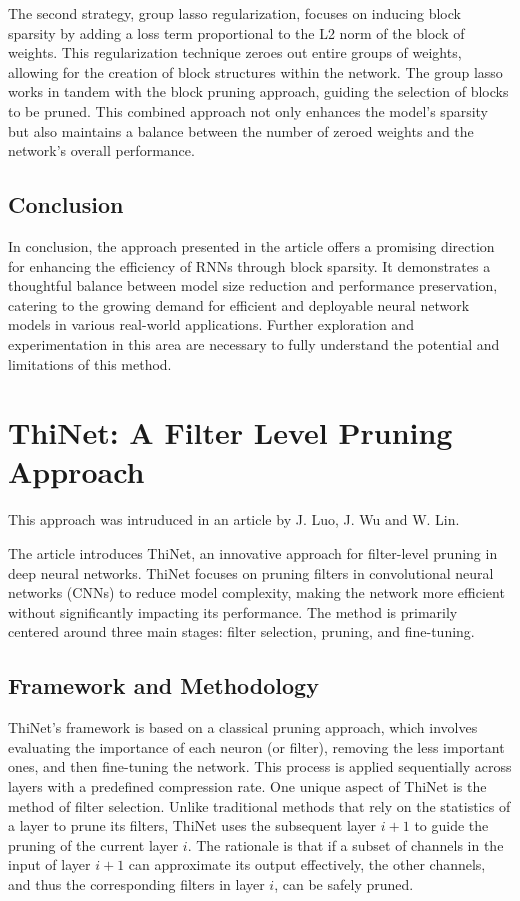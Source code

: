 The second strategy, group lasso regularization, focuses on inducing block sparsity by adding a loss term proportional to the L2 norm of the block of weights. This regularization technique zeroes out entire groups of weights, allowing for the creation of block structures within the network. The group lasso works in tandem with the block pruning approach, guiding the selection of blocks to be pruned. This combined approach not only enhances the model's sparsity but also maintains a balance between the number of zeroed weights and the network's overall performance.

\subsection{Conclusion}

In conclusion, the approach presented in the article offers a promising direction for enhancing the efficiency of RNNs through block sparsity. It demonstrates a thoughtful balance between model size reduction and performance preservation, catering to the growing demand for efficient and deployable neural network models in various real-world applications. Further exploration and experimentation in this area are necessary to fully understand the potential and limitations of this method.

\section{ThiNet: A Filter Level Pruning Approach}
This approach was intruduced in an article \cite{thinet} by J. Luo, J. Wu and W. Lin.

The article introduces ThiNet, an innovative approach for filter-level pruning in deep neural networks. ThiNet focuses on pruning filters in convolutional neural networks (CNNs) to reduce model complexity, making the network more efficient without significantly impacting its performance. The method is primarily centered around three main stages: filter selection, pruning, and fine-tuning.

\subsection{Framework and Methodology}

ThiNet's framework is based on a classical pruning approach, which involves evaluating the importance of each neuron (or filter), removing the less important ones, and then fine-tuning the network. This process is applied sequentially across layers with a predefined compression rate. One unique aspect of ThiNet is the method of filter selection. Unlike traditional methods that rely on the statistics of a layer to prune its filters, ThiNet uses the subsequent layer $i + 1$ to guide the pruning of the current layer $i$. The rationale is that if a subset of channels in the input of layer $i + 1$ can approximate its output effectively, the other channels, and thus the corresponding filters in layer $i$, can be safely pruned.

